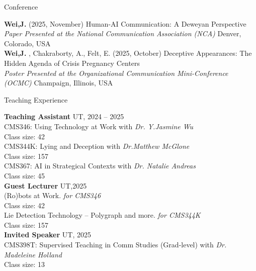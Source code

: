 \documentclass[
	11pt, %
]{resume} %
\begin{document}
\begin{rSection}{Conference}

    
	\textbf{Wei,J.} (2025, November) Human-AI Communication: A Deweyan Perspective\\
	\textit{Paper Presented at the National Communication Association (NCA)} \hfill Denver, Colorado, USA \\

	\textbf{Wei,J.} , Chakraborty, A., Felt, E. (2025, October) Deceptive Appearances: The Hidden Agenda of Crisis Pregnancy Centers \\
	\textit{Poster Presented at the Organizational Communication Mini-Conference (OCMC)} \hfill Champaign, Illinois, USA \\
	
\end{rSection}


\begin{rSection}{Teaching Experience}
	
    \textbf{Teaching Assistant} \hfill UT, 2024 -- 2025 \\ 
    CMS346: Using Technology at Work  with \textit{Dr. Y.Jasmine Wu}\\
    \textbullet\enspace  Class size: 42\\
    CMS344K: Lying and Deception  with \textit{Dr.Matthew McGlone}\\
    \textbullet\enspace  Class size: 157\\
    CMS367:  AI in Strategical Contexts with \textit{Dr. Natalie Andreas}\\
    \textbullet\enspace  Class size: 45\\

    \textbf{Guest Lecturer} \hfill UT,2025\\ 
    (Ro)bots at Work. \textit{for CMS346}\\
    \textbullet\enspace  Class size: 42\\
    Lie Detection Technology – Polygraph and more. \textit{for CMS344K}\\
     \textbullet\enspace  Class size: 157\\

    \textbf{Invited Speaker} \hfill UT, 2025 \\ 
    CMS398T: Supervised Teaching in Comm Studies (Grad-level) with \textit{Dr. Madeleine Holland}\\
     \textbullet\enspace  Class size: 13\\



\end{rSection}
\end{document}
